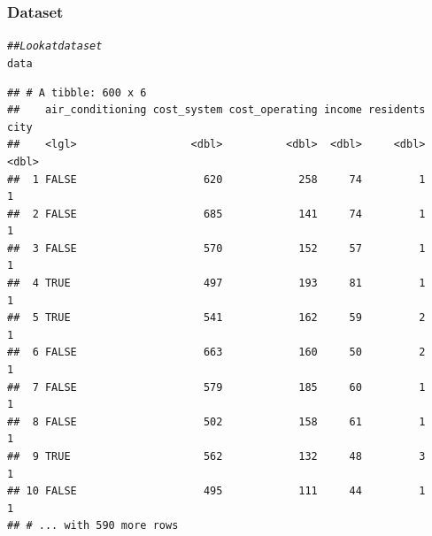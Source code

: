 \documentclass{beamer}\usepackage[]{graphicx}\usepackage[]{color}
\makeatletter
\newcommand{\hlstr}[1]{\textcolor[rgb]{0.192,0.494,0.8}{#1}}%
\newcommand{\hlcom}[1]{\textcolor[rgb]{0.678,0.584,0.686}{\textit{#1}}}%
\newcommand{\hlopt}[1]{\textcolor[rgb]{0,0,0}{#1}}%
\newcommand{\hlstd}[1]{\textcolor[rgb]{0.345,0.345,0.345}{#1}}%
\newcommand{\hlkwb}[1]{\textcolor[rgb]{0.69,0.353,0.396}{#1}}%
\newcommand{\hlkwc}[1]{\textcolor[rgb]{0.333,0.667,0.333}{#1}}%
\newcommand{\hlkwd}[1]{\textcolor[rgb]{0.737,0.353,0.396}{\textbf{#1}}}%
\newenvironment{kframe}{%
 \def\at@end@of@kframe{}%
 \ifinner\ifhmode%
  \def\at@end@of@kframe{\end{minipage}}%
  \begin{minipage}{\columnwidth}%
 \fi\fi%
 \def\FrameCommand##1{\hskip\@totalleftmargin \hskip-\fboxsep
 \colorbox{shadecolor}{##1}\hskip-\fboxsep
     \hskip-\linewidth \hskip-\@totalleftmargin \hskip\columnwidth}%
 \MakeFramed {\advance\hsize-\width
   \@totalleftmargin\z@ \linewidth\hsize
   \@setminipage}}%
 {\par\unskip\endMakeFramed%
 \at@end@of@kframe}
\newenvironment{knitrout}{}{} %
\makeatother
\begin{document}
\begin{frame}[fragile]\frametitle{Dataset}
\begin{knitrout}\footnotesize
{}\color{fgcolor}\begin{kframe}
\begin{alltt}
\hlcom{## Look at dataset}
\hlstd{data}
\end{alltt}
\begin{verbatim}
## # A tibble: 600 x 6
##    air_conditioning cost_system cost_operating income residents  city
##    <lgl>                  <dbl>          <dbl>  <dbl>     <dbl> <dbl>
##  1 FALSE                    620            258     74         1     1
##  2 FALSE                    685            141     74         1     1
##  3 FALSE                    570            152     57         1     1
##  4 TRUE                     497            193     81         1     1
##  5 TRUE                     541            162     59         2     1
##  6 FALSE                    663            160     50         2     1
##  7 FALSE                    579            185     60         1     1
##  8 FALSE                    502            158     61         1     1
##  9 TRUE                     562            132     48         3     1
## 10 FALSE                    495            111     44         1     1
## # ... with 590 more rows
\end{verbatim}
\end{kframe}
\end{knitrout}
\end{frame}

\end{document}
